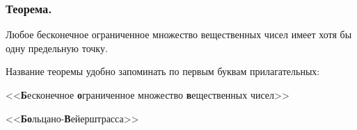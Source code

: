 \subsubsection{Теорема.}

Любое бесконечное ограниченное множество вещественных чисел имеет хотя бы одну предельную точку.

\mnemo

Название теоремы удобно запоминать по первым буквам прилагательных:

<<\textbf{Б}есконечное \textbf{о}граниченное множество \textbf{в}ещественных чисел>>

<<\textbf{Бо}льцано-\textbf{В}ейерштрасса>>
